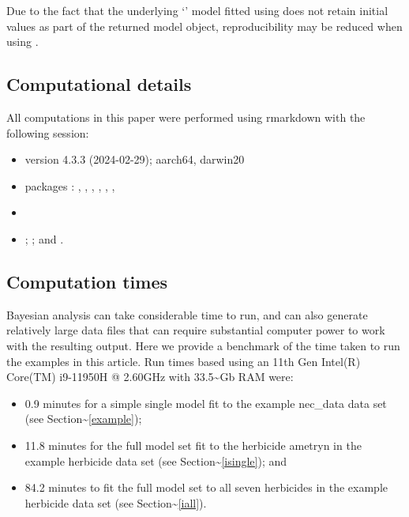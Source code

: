 \documentclass[
  shortnames]{jss}
\newcommand{\cls}[1]{`\code{#1}'}
\begin{document}
Due to the fact that the underlying \cls{brmsfit} model fitted using  does not retain initial values as part of the returned model object, reproducibility may be reduced when using .

\subsection[Computational detail]{Computational details}\label{compdetails}

All computations in this paper were performed using rmarkdown \citep{allaire2023} with the following
 session:

\begin{itemize}
\item
   version 4.3.3 (2024-02-29); aarch64, darwin20
\item
   packages \citep{rcore}: , , , , , , 
\item
   \citep{pkg:bayesnec}
\item
   \citep{Burkner2017};  \citep{ggplot}; and  \citep{rcpp}.
\end{itemize}

\hypertarget{computation-times}{%
\subsection{Computation times}\label{computation-times}}

Bayesian analysis can take considerable time to run, and can also generate relatively large data files that can require substantial computer power to work with the resulting output. Here we provide a benchmark of the time taken to run the examples in this article. Run times based using an 11th Gen Intel(R) Core(TM) i9-11950H @ 2.60GHz with 33.5\textasciitilde Gb RAM were:

\begin{itemize}
\item
  0.9 minutes for a simple single model fit to the example nec\_data data set (see Section\textasciitilde{}\ref{example});
\item
  11.8 minutes for the full  model set fit to the herbicide ametryn in the example herbicide data set (see Section\textasciitilde{}\ref{isingle}); and
\item
  84.2 minutes to fit the full  model set to all seven herbicides in the example herbicide data set (see Section\textasciitilde{}\ref{iall}).
\end{itemize}
\end{document}
